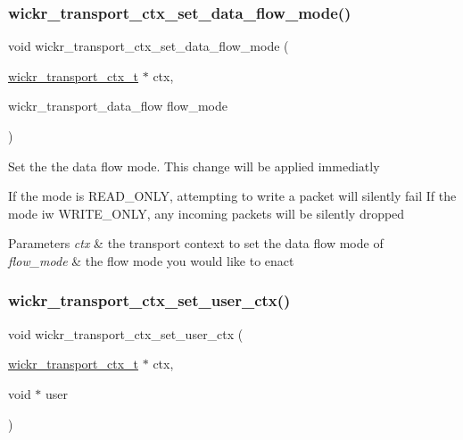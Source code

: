 \subsubsection{\texorpdfstring{wickr\_transport\_ctx\_set\_data\_flow\_mode()}{wickr\_transport\_ctx\_set\_data\_flow\_mode()}}
{\footnotesize\ttfamily void wickr\+\_\+transport\+\_\+ctx\+\_\+set\+\_\+data\+\_\+flow\+\_\+mode (\begin{DoxyParamCaption}\item[{\mbox{\hyperlink{structwickr__transport__ctx}{wickr\+\_\+transport\+\_\+ctx\+\_\+t}} $\ast$}]{ctx,  }\item[{wickr\+\_\+transport\+\_\+data\+\_\+flow}]{flow\+\_\+mode }\end{DoxyParamCaption})}

Set the the data flow mode. This change will be applied immediatly

If the mode is R\+E\+A\+D\+\_\+\+O\+N\+LY, attempting to write a packet will silently fail If the mode iw W\+R\+I\+T\+E\+\_\+\+O\+N\+LY, any incoming packets will be silently dropped


\begin{DoxyParams}{Parameters}
{\em ctx} & the transport context to set the data flow mode of \\
\hline
{\em flow\+\_\+mode} & the flow mode you would like to enact \\
\hline
\end{DoxyParams}
\mbox{\label{group__wickr__transport__ctx_gac1865750950d6ff5ba3850c5f03ab3c9}} 
\subsubsection{\texorpdfstring{wickr\_transport\_ctx\_set\_user\_ctx()}{wickr\_transport\_ctx\_set\_user\_ctx()}}
{\footnotesize\ttfamily void wickr\+\_\+transport\+\_\+ctx\+\_\+set\+\_\+user\+\_\+ctx (\begin{DoxyParamCaption}\item[{\mbox{\hyperlink{structwickr__transport__ctx}{wickr\+\_\+transport\+\_\+ctx\+\_\+t}} $\ast$}]{ctx,  }\item[{void $\ast$}]{user }\end{DoxyParamCaption})}

